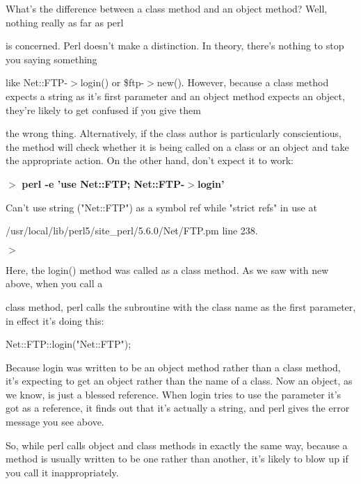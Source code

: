 \documentclass[a4paper,11pt]{book}
\begin{document}
\noindent 

\noindent What's the difference between a class method and an object method? Well, nothing really as far as perl

\noindent is concerned. Perl doesn't make a distinction. In theory, there's nothing to stop you saying something

\noindent like Net::FTP-$>$login() or \$ftp-$>$new(). However, because a class method expects a string as it's first parameter and an object method expects an object, they're likely to get confused if you give them

\noindent the wrong thing. Alternatively, if the class author is particularly conscientious, the method will check whether it is being called on a class or an object and take the appropriate action. On the other hand, don't expect it to work:

\noindent 

\noindent $>$ \textbf{perl -e 'use Net::FTP; Net::FTP-$>$login'}

\noindent Can't use string ("Net::FTP") as a symbol ref while "strict refs" in use at

\noindent /usr/local/lib/perl5/site\_perl/5.6.0/Net/FTP.pm line 238.

\noindent $>$

\noindent 

\noindent Here, the login() method was called as a class method. As we saw with new above, when you call a

\noindent class method, perl calls the subroutine with the class name as the first parameter, in effect it's doing this:

\noindent 

\noindent Net::FTP::login("Net::FTP");

\noindent 

\noindent Because login was written to be an object method rather than a class method, it's expecting to get an object rather than the name of a class. Now an object, as we know, is just a blessed reference. When login tries to use the parameter it's got as a reference, it finds out that it's actually a string, and perl gives the error message you see above.

\noindent 

\noindent So, while perl calls object and class methods in exactly the same way, because a method is usually written to be one rather than another, it's likely to blow up if you call it inappropriately.

\noindent 
\end{document}
